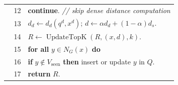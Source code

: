\begin{center}
\begin{tabular}{r p{0.88\linewidth}}
12 & \quad\quad \textbf{continue}. \hfill \textit{// skip dense distance computation} \\
13 & \quad $d_d\leftarrow d_d(q^d,x^d)$; $d\leftarrow\alpha d_d+(1-\alpha)d_s$. \\
14 & \quad $R\leftarrow\operatorname{UpdateTopK}(R,(x,d),k)$. \\
15 & \quad \textbf{for all} $y\in N_G(x)$ \textbf{do} \\
16 & \quad\quad \textbf{if} $y\notin V_{\mathrm{seen}}$ \textbf{then} insert or update $y$ in $Q$. \\
17 & \textbf{return} $R$. \\
\hline
\end{tabular}
\end{center}
